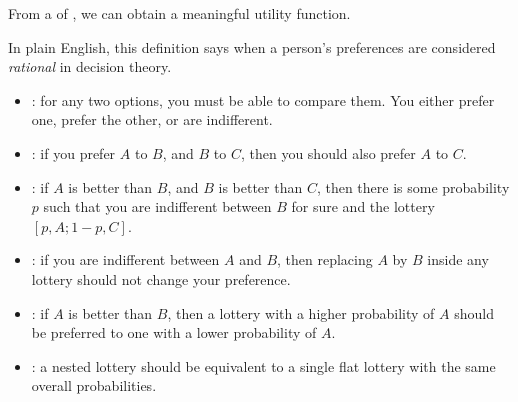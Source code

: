 \begin{tcolorbox}[colback=red!5!white,colframe=red!75!black]
From a  of , we can obtain a meaningful utility function.
\end{tcolorbox}

In plain English, this definition says when a person's preferences are considered \emph{rational} in decision theory.
\begin{itemize}
    \item {}: for any two options, you must be able to compare them. You either prefer one, prefer the other, or are indifferent.
    \item {}: if you prefer $A$ to $B$, and $B$ to $C$, then you should also prefer $A$ to $C$.
    \item {}: if $A$ is better than $B$, and $B$ is better than $C$, then there is some probability $p$ such that you are indifferent between $B$ for sure and the lottery $[p,A ; 1-p,C]$.
    \item {}: if you are indifferent between $A$ and $B$, then replacing $A$ by $B$ inside any lottery should not change your preference.
    \item {}: if $A$ is better than $B$, then a lottery with a higher probability of $A$ should be preferred to one with a lower probability of $A$.
    \item {}: a nested lottery should be equivalent to a single flat lottery with the same overall probabilities.
\end{itemize}
